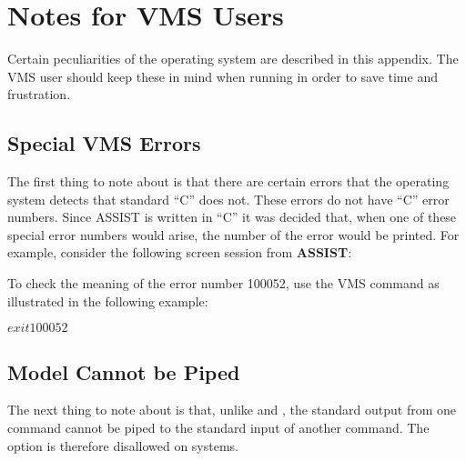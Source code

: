 \section{Notes for VMS Users}
\label{apix:vms}

Certain peculiarities of the  operating system are described
in this appendix.
The VMS user should keep these in mind when
running  in order to
save time and frustration.

\subsection{Special VMS Errors}

The first thing to note about  is that there are
certain errors\label{lab:vmserror} that
the  operating system detects that standard  ``C''
does not.  These
errors do not have ``C'' error numbers.   Since {\acronym ASSIST} is written in
``C'' it was decided that, when one of these special error numbers would
arise, the number of the error would be printed.
For example, consider the following
screen session from {\bf ASSIST}:

To check the meaning of the error number 100052, use the VMS 
command as illustrated in the following example:
\begin{codeexample}
$ exit 100052
$
\end{codeexample}

\subsection{Model Cannot be Piped}

The next thing to note about  is that, unlike 
and , the standard output from one command cannot be
piped to the standard input of another command.   The  option
is therefore disallowed on  systems.




